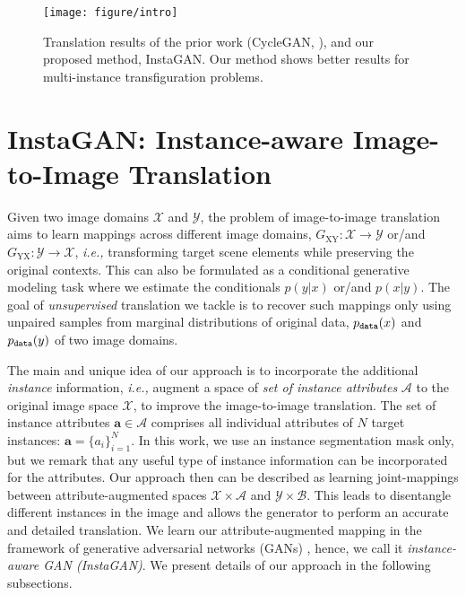 \documentclass{article} \usepackage{iclr2019_conference,times}
\begin{document}
\begin{figure}[t]
\vspace{-0.25in}
\centering
\texttt{[image: figure/intro]}
\caption{
Translation results of the prior work (CycleGAN, \citet{zhu2017unpaired}), and our proposed method, InstaGAN.
Our method shows better results for multi-instance transfiguration problems.
} \label{fig:motivation}
\vspace{-0.15in}
\end{figure}





 \vspace{-0.05in}
\section{InstaGAN: Instance-aware Image-to-Image Translation}
\label{sec:method}
\vspace{-0.05in}

Given two image domains $\mathcal{X}$ and $\mathcal{Y}$, the problem of image-to-image translation aims to learn
mappings across different image domains, $G_\textrm{XY}: \mathcal{X} \to \mathcal{Y}$ or/and $G_\textrm{YX}: \mathcal{Y} \to \mathcal{X}$, \textit{i.e.,} transforming target scene elements while preserving the {original contexts.} This can also be formulated as a conditional generative modeling task where we estimate the conditionals $p(y|x)$ or/and $p(x|y)$. 
The goal of {\it unsupervised} translation we tackle is to recover such mappings only using unpaired
samples from marginal distributions of original data,
$p_{\tt data}(x)$ and $p_{\tt data}(y)$ of two image domains.

The main and unique idea of our approach is to incorporate the additional \textit{instance} information,
\textit{i.e.,} augment a space of \textit{set of instance attributes} $\mathcal{A}$ to the original image space $\mathcal{X}$,
to improve the image-to-image translation.
The set of instance attributes $\bm{a} \in \mathcal{A}$ comprises all individual attributes of $N$ target instances: $\bm{a} = \{a_i\}_{i=1}^{N}$. In this work, we use an instance segmentation mask only, but we remark that any useful type of instance information can be incorporated for the attributes. 
Our approach then can be described as learning joint-mappings between attribute-augmented spaces 
$\mathcal{X} \times \mathcal{A}$ and $\mathcal{Y} \times \mathcal{B}$.
This leads to disentangle different instances in the image
and allows the generator to perform an accurate and detailed translation.
We learn our attribute-augmented mapping in the framework of generative adversarial networks (GANs) \citep{goodfellow2014generative},
hence, we call it \textit{instance-aware GAN (InstaGAN)}. 
We present details of our approach in the following subsections. 
\end{document}
